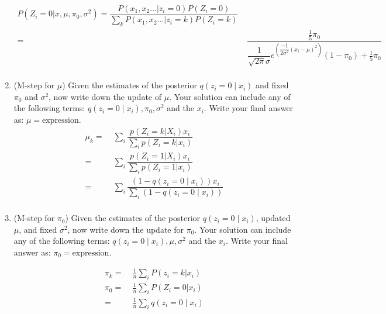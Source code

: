 \begin{enumerate}
\begin{align*}
	P(Z_i = 0 | x, \mu, \pi_0 , \sigma^2) = \dfrac{P (x_1 , x_2 \ldots | z_i =0) P (Z_i = 0)} {\sum_k P (x_1 , x_2 \ldots | z_i =k) P (Z_i = k)  } \\
	=&\; \dfrac{ \frac{1}{5} \pi_0 }
		        {\dfrac{1}{\sqrt{2 \pi} \sigma} e^{\left(\dfrac{-1}{2 \sigma^2} (x_i - \mu)^2 \right) } (1 - \pi_0) + \frac{1}{5} \pi_0} \\
\end{align*}  

\item {} (M-step for $\mu$) Given the estimates of the
  posterior $q(z_i = 0 \mid x_i)$ and fixed $\pi_0$ and $\sigma^2$,
  now write down the update of $\mu$.  Your solution can include any
  of the following terms: $q(z_i = 0 \mid x_i), \pi_0, \sigma^2$ and
  the $x_i$.  Write your final answer as: $\mu = \textrm{expression}$.
\begin{align*}
	\mu_k = &\; \sum_i \dfrac{p (Z_i = k| X_i) x_i}
                                                    {\sum_i p (Z_i = k| x_i)} \\
	=&\;  \sum_i \dfrac{p (Z_i = 1| X_i) x_i}
                                         {\sum_i p (Z_i = 1| x_i)} \\
	=&\; \sum_i \dfrac{\left( 1 - q(z_i = 0 \mid x_i) \right) x_i}
                                         {\sum_i \left( 1 - q(z_i = 0 \mid x_i)    \right)} \\
\end{align*}
  
\item {} (M-step for $\pi_0$) Given the estimates of the
  posterior $q(z_i = 0 \mid x_i)$, updated $\mu$, and fixed
  $\sigma^2$, now write down the update for $\pi_0$.  Your solution
  can include any of the following terms: $q(z_i = 0 \mid x_i), \mu,
  \sigma^2$ and the $x_i$.  Write your final answer as: $\pi_0 =
  \textrm{expression}$.

\begin{align*}
	\pi_k =&\; \frac{1}{n} \sum_i P (z_i = k | x_i) \\
	\pi_0 =&\; \frac{1}{n} \sum_i P(Z_i =0 | x_i ) \\
	=&\; \frac{1}{n} \sum_i  q(z_i = 0 \mid x_i) \\
\end{align*}
  

\end{enumerate}
